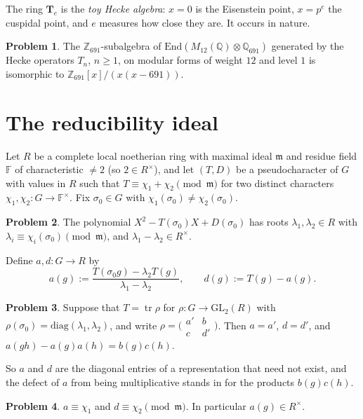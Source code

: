 \documentclass[reqno]{amsart}
\theoremstyle{definition}
\newtheorem{problem}{Problem}[section]
\theoremstyle{plain}
\newcommand{\Z}{\mathbb{Z}}
\newcommand{\Q}{\mathbb{Q}}
\newcommand{\F}{\mathbb{F}}
\newcommand{\Tb}{\mathbf{T}}
\newcommand{\tr}{\operatorname{tr}}
\newcommand{\mat}[4]{\bigl(\begin{smallmatrix} #1 & #2 \\ #3 & #4 \end{smallmatrix}\bigr)}
\begin{document}
The ring \(\Tb_e\) is the \emph{toy Hecke algebra}: \(x = 0\) is the Eisenstein point, \(x = p^e\) the cuspidal point, and \(e\) measures how close they are.  It occurs in nature.

\begin{problem}\label{pr:hecke-691}
The \(\Z_{691}\)-subalgebra of \(\mathrm{End}(M_{12}(\Q) \otimes \Q_{691})\) generated by the Hecke operators \(T_n\), \(n \ge 1\), on modular forms of weight \(12\) and level \(1\) is isomorphic to \(\Z_{691}[x]/(x(x - 691))\).
\end{problem}

\section{The reducibility ideal}\label{sec:red}

Let \(R\) be a complete local noetherian ring with maximal ideal \(\mathfrak m\) and residue field \(\F\) of characteristic \(\ne 2\) (so \(2 \in R^\times\)), and let \((T, D)\) be a pseudocharacter of \(G\) with values in \(R\) such that \(T \equiv \chi_1 + \chi_2 \pmod{\mathfrak m}\) for two distinct characters \(\chi_1, \chi_2 \colon G \to \F^\times\).  Fix \(\sigma_0 \in G\) with \(\chi_1(\sigma_0) \ne \chi_2(\sigma_0)\).

\begin{problem}\label{pr:roots}
The polynomial \(X^2 - T(\sigma_0)X + D(\sigma_0)\) has roots \(\lambda_1, \lambda_2 \in R\) with \(\lambda_i \equiv \chi_i(\sigma_0) \pmod{\mathfrak m}\), and \(\lambda_1 - \lambda_2 \in R^\times\).
\end{problem}

Define \(a, d \colon G \to R\) by
\[
  a(g) := \frac{T(\sigma_0 g) - \lambda_2 T(g)}{\lambda_1 - \lambda_2} , \qquad d(g) := T(g) - a(g) .
\]

\begin{problem}\label{pr:a-entry}
Suppose that \(T = \tr\rho\) for \(\rho \colon G \to \mathrm{GL}_2(R)\) with \(\rho(\sigma_0) = \mathrm{diag}(\lambda_1, \lambda_2)\), and write \(\rho = \mat{a'}{b}{c}{d'}\).  Then \(a = a'\), \(d = d'\), and \(a(gh) - a(g)a(h) = b(g)c(h)\).
\end{problem}

So \(a\) and \(d\) are the diagonal entries of a representation that need not exist, and the defect of \(a\) from being multiplicative stands in for the products \(b(g)c(h)\).

\begin{problem}\label{pr:a-residual}
\(a \equiv \chi_1\) and \(d \equiv \chi_2 \pmod{\mathfrak m}\).  In particular \(a(g) \in R^\times\).
\end{problem}
\end{document}
